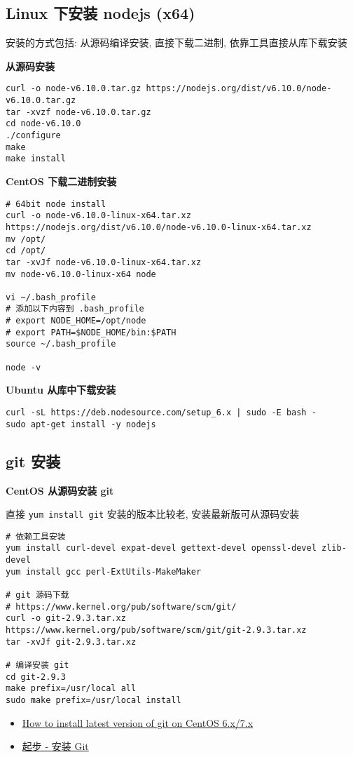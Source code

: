 \subsection{Linux 下安装 nodejs
(x64)}\label{linux-ux4e0bux5b89ux88c5-nodejs-x64}

安装的方式包括: 从源码编译安装, 直接下载二进制, 依靠工具直接从库下载安装

\textbf{从源码安装}

\begin{verbatim}
curl -o node-v6.10.0.tar.gz https://nodejs.org/dist/v6.10.0/node-v6.10.0.tar.gz
tar -xvzf node-v6.10.0.tar.gz
cd node-v6.10.0
./configure
make
make install
\end{verbatim}

\textbf{CentOS 下载二进制安装}

\begin{verbatim}
# 64bit node install
curl -o node-v6.10.0-linux-x64.tar.xz https://nodejs.org/dist/v6.10.0/node-v6.10.0-linux-x64.tar.xz
mv /opt/
cd /opt/
tar -xvJf node-v6.10.0-linux-x64.tar.xz
mv node-v6.10.0-linux-x64 node

vi ~/.bash_profile
# 添加以下内容到 .bash_profile
# export NODE_HOME=/opt/node
# export PATH=$NODE_HOME/bin:$PATH
source ~/.bash_profile

node -v
\end{verbatim}

\textbf{Ubuntu 从库中下载安装}

\begin{verbatim}
curl -sL https://deb.nodesource.com/setup_6.x | sudo -E bash -
sudo apt-get install -y nodejs
\end{verbatim}

\subsection{git 安装}\label{git-ux5b89ux88c5}

\textbf{CentOS 从源码安装 git}

直接 \texttt{yum\ install\ git} 安装的版本比较老, 安装最新版可从源码安装

\begin{verbatim}
# 依赖工具安装
yum install curl-devel expat-devel gettext-devel openssl-devel zlib-devel
yum install gcc perl-ExtUtils-MakeMaker

# git 源码下载
# https://www.kernel.org/pub/software/scm/git/
curl -o git-2.9.3.tar.xz https://www.kernel.org/pub/software/scm/git/git-2.9.3.tar.xz
tar -xvJf git-2.9.3.tar.xz

# 编译安装 git
cd git-2.9.3
make prefix=/usr/local all
sudo make prefix=/usr/local install
\end{verbatim}

\begin{itemize}
\tightlist
\item
  \href{http://stackoverflow.com/questions/21820715/how-to-install-latest-version-of-git-on-centos-6-x-7-x}{How
  to install latest version of git on CentOS 6.x/7.x}
\item
  \href{https://git-scm.com/book/zh/v1/\%E8\%B5\%B7\%E6\%AD\%A5-\%E5\%AE\%89\%E8\%A3\%85-Git}{起步
  - 安装 Git}
\end{itemize}
